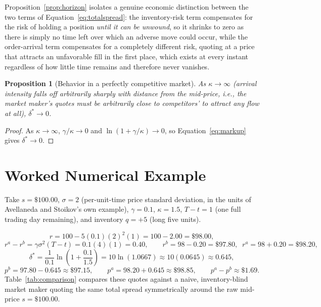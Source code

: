 \documentclass[11pt]{article}
\newtheorem{proposition}{Proposition}
\theoremstyle{remark}
\theoremstyle{definition}
\begin{document}
Proposition~\ref{prop:horizon} isolates a genuine economic distinction between the two terms of Equation~\eqref{eq:totalspread}: the inventory-risk term compensates for the risk of holding a position \emph{until it can be unwound}, so it shrinks to zero as there is simply no time left over which an adverse move could occur, while the order-arrival term compensates for a completely different risk, quoting at a price that attracts an unfavorable fill in the first place, which exists at every instant regardless of how little time remains and therefore never vanishes.

\begin{proposition}[Behavior in a perfectly competitive market]
\label{prop:competitive}
As $\kappa\to\infty$ (arrival intensity falls off arbitrarily sharply with distance from the mid-price, i.e., the market maker's quotes must be arbitrarily close to competitors' to attract any flow at all), $\delta^{*}\to0$.
\end{proposition}
\begin{proof}
As $\kappa\to\infty$, $\gamma/\kappa\to0$ and $\ln(1+\gamma/\kappa)\to0$, so Equation~\eqref{eq:markup} gives $\delta^{*}\to0$.
\end{proof}

\section{Worked Numerical Example}
\label{sec:example}

Take $s=\$100.00$, $\sigma=2$ (per-unit-time price standard deviation, in the units of Avellaneda and Stoikov's own example), $\gamma=0.1$, $\kappa=1.5$, $T-t=1$ (one full trading day remaining), and inventory $q=+5$ (long five units).

\begin{equation*}
r = 100 - 5(0.1)(2)^2(1) = 100-2.00 = \$98.00,
\end{equation*}
\begin{equation*}
r^a-r^b = \gamma\sigma^2(T-t) = 0.1(4)(1) = 0.40, \qquad r^b=98-0.20=\$97.80,\;\; r^a=98+0.20=\$98.20,
\end{equation*}
\begin{equation*}
\delta^{*} = \frac{1}{0.1}\ln\!\left(1+\frac{0.1}{1.5}\right) = 10\ln(1.0667) \approx 10(0.0645) \approx 0.645,
\end{equation*}
\begin{equation*}
p^b = 97.80-0.645 \approx \$97.15, \qquad p^a = 98.20+0.645 \approx \$98.85, \qquad p^a-p^b \approx \$1.69.
\end{equation*}
Table~\ref{tab:comparison} compares these quotes against a naive, inventory-blind market maker quoting the same total spread symmetrically around the raw mid-price $s=\$100.00$.
\end{document}

